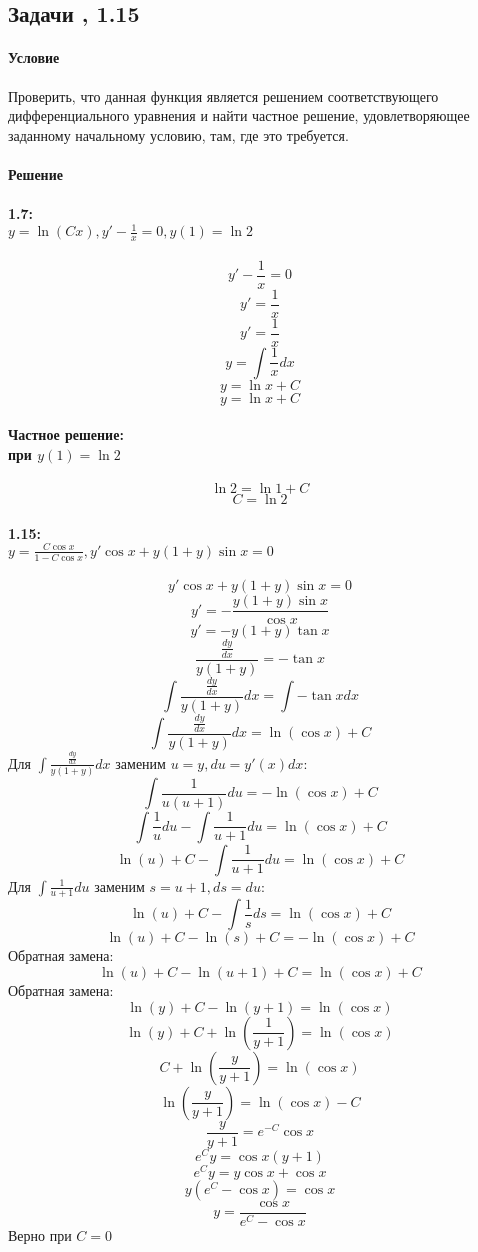 \subsection{Задачи , 1.15}
\paragraph{Условие}
Проверить, что данная функция является решением соответствующего дифференциального уравнения и найти частное решение, удовлетворяющее заданному начальному условию, там, где это требуется.
\paragraph{Решение}
\paragraph{1.7:\\ $y = \ln(Cx), y' - \frac{1}{x} = 0, y(1) = \ln2$}
\[y' - \frac{1}{x} = 0\]
\[y' = \frac{1}{x}\]
\[y' = \frac{1}{x}\]
\[y = \int \frac{1}{x}dx\]
\[y = \ln x + C\]
\[y = \ln x + C\]
\paragraph{Частное решение:\\ при $y(1) = \ln2$}
\[\ln2 = \ln1 + C\]
\[C = \ln2\]

\paragraph{1.15:\\ $y = \frac{C\cos x}{1 - C\cos x}, y'\cos x + y(1 + y)\sin x = 0$}
\[y'\cos x + y(1 + y)\sin x = 0\]
\[y' = - \frac{y(1 + y)\sin x}{\cos x}\]
\[y' = - y(1 + y)\tan x\]
\[\frac{\frac{dy}{dx}}{y(1 + y)} = - \tan x\]
\[\int\frac{\frac{dy}{dx}}{y(1 + y)}dx = \int-\tan xdx\]
\[\int\frac{\frac{dy}{dx}}{y(1 + y)}dx = \ln(\cos x) + C\]
Для $\int\frac{\frac{dy}{dx}}{y(1 + y)}dx$ заменим $u = y, du = y'(x)dx$:
\[\int\frac{1}{u(u + 1)}du = -\ln(\cos x) + C\]
\[\int\frac{1}{u}du - \int\frac{1}{u + 1}du = \ln(\cos x) + C\]
\[\ln(u) + C - \int\frac{1}{u + 1}du = \ln(\cos x) + C\]
Для $\int\frac{1}{u + 1}du$ заменим $s = u + 1, ds = du$:
\[\ln(u) + C - \int\frac{1}{s}ds = \ln(\cos x) + C\]
\[\ln(u) + C - \ln(s) + C = -\ln(\cos x) + C\]
Обратная замена:
\[\ln(u) + C - \ln(u + 1) + C = \ln(\cos x) + C\]
Обратная замена:
\[\ln(y) + C - \ln(y + 1) = \ln(\cos x)\]
\[\ln(y) + C + \ln\left(\frac{1}{y + 1}\right) = \ln(\cos x)\]
\[C + \ln\left(\frac{y}{y + 1}\right) = \ln(\cos x)\]
\[\ln\left(\frac{y}{y + 1}\right) = \ln(\cos x) - C\]
\[\frac{y}{y + 1} = e^{-C}\cos x \]
\[e^C y = \cos x (y + 1)\]
\[e^C y = y\cos x + \cos x\]
\[y(e^C - \cos x) = \cos x\]
\[y = \frac{\cos x}{e^C - \cos x}\]
Верно при $C = 0$

